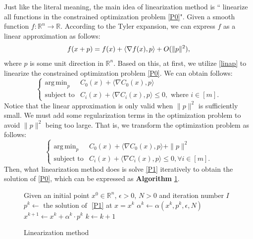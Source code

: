 \documentclass[conference]{IEEEtran}
\makeatletter
\DeclareMathOperator*{\argmin}{arg\,min}
\newcommand{\removelatexerror}{\let\@latex@error\@gobble}
\makeatother
\begin{document}
Just like the literal meaning, the main idea of linearization method is `` linearize all functions in the constrained optimization problem \eqref{P0}". Given a smooth function $f: \mathbb{R}^n \rightarrow \mathbb{R}$. According to the Tyler expansion, we can express $f$ as a linear approximation as follows:
\begin{equation}
    f(x+p) =  f(x) + \braket{\nabla f(x), p} + O(\|p\|^2),\label{linap}
\end{equation}
where $p$ is some unit direction in $\mathbb{R}^n$. Based on this, at first, we utilize \eqref{linap} to linearize the constrained optimization problem \eqref{P0}. We can obtain follows:
\begin{equation*}
\begin{cases}
    \argmin_{p} &C_0(x) + \langle \nabla C_0(x), p\rangle \\
    \text{subject to} &C_i(x) + \langle \nabla C_i(x), p\rangle \leq 0, \text{ where } i \in [m].
\end{cases}
\end{equation*}
Notice that the linear approximation is only valid when $\|p\|^2$ is sufficiently small. We must add some regularization terms in the optimization problem to avoid $\|p\|^2$ being too large. That is, we transform the optimization problem as follows:
\begin{equation*}
\tag{P1}
\begin{cases}
    \argmin_{p} &C_0(x) + \langle \nabla C_0(x), p\rangle +  \|p\|^2\\
    \text{subject to} &C_i(x) + \langle \nabla C_i(x), p\rangle \leq 0,\forall i \in [m].\label{P1}
\end{cases}
\end{equation*}
Then, what linearization method does is solve \eqref{P1} iteratively to obtain the solution of \eqref{P0}, which can be expressed as \textbf{Algorithm} \ref{linerarization}.
\begin{figure}[htbp]
 \removelatexerror
  \begin{algorithm}[H]
   \caption{Linearization method}
   Given an initial point $x^0 \in \mathbb{R}^n$, $\epsilon > 0$, $N>0$ and iteration number $I$\;
   {
      $p^k \gets \text{ the solution of }$ \eqref{P1} at $x = x^k$\;
      $\alpha^k\gets\alpha(x^k, p^k, \epsilon, N)$
      $x^{k+1}\gets x^k + \alpha^k \cdot p^k$\;
      $k\gets k+1$\;
   }
   \newline

   {\color{blue} 
   }
   \label{linerarization}
  \end{algorithm}
\end{figure}
\end{document}
